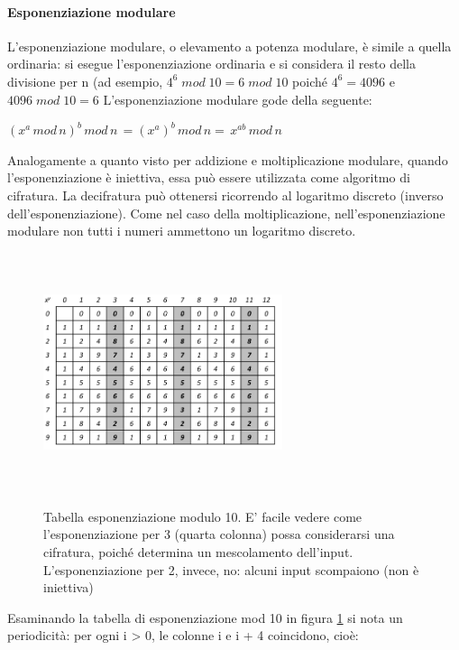 \paragraph{Esponenziazione modulare}
L'esponenziazione modulare, o elevamento a potenza modulare, è simile a quella ordinaria: si esegue l'esponenziazione ordinaria e si considera il resto della divisione per n (ad esempio, $4^6 \; mod \; 10 = 6 \; mod \; 10$ poiché $4^6 = 4096$ e $4096 \; mod \; 10 = 6$
\newline \newline 
L'esponenziazione modulare gode della seguente:
\begin{prop} \label{prop:exp1}
$(x^a \, mod \, n)^b \, mod \, n \, =  (x^{a})^b \, mod \, n =  \, x^{ab} \, mod \, n$
\end{prop}
Analogamente a quanto visto per addizione e moltiplicazione modulare, quando l'esponenziazione è iniettiva, essa può essere utilizzata come algoritmo di cifratura. La decifratura può ottenersi ricorrendo al logaritmo discreto
(inverso dell'esponenziazione). Come nel caso della moltiplicazione, nell'esponenziazione modulare non tutti i numeri ammettono un logaritmo discreto.
\begin{figure}[htbp]
	\centering%
	\subfigure%
	{\includegraphics[height=7cm, width=7cm, keepaspectratio]{Immagini/chiave_pubblica/exp_mod.png}}
	\caption{Tabella esponenziazione modulo 10. E' facile vedere come l'esponenziazione per 3 (quarta colonna) possa considerarsi una cifratura, poiché determina un mescolamento dell'input. L'esponenziazione per 2, invece, no: alcuni input scompaiono (non è iniettiva) \label{fig:exp_mod}} 	
\end{figure}
\newline \newline
Esaminando la tabella di esponenziazione mod 10 in figura \ref{fig:exp_mod} si nota un periodicità: per ogni i > 0, le colonne i e i + 4 coincidono, cioè:
